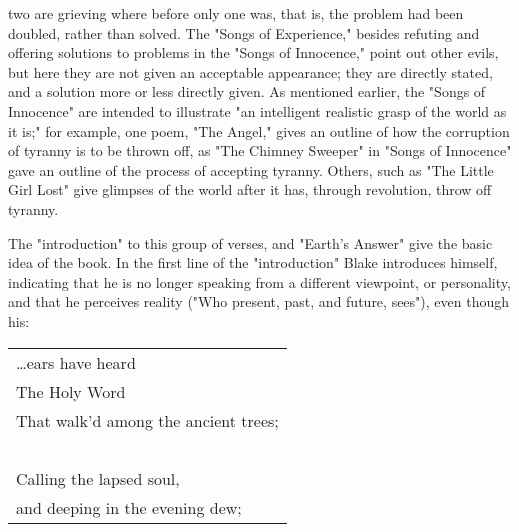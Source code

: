 two are grieving where before only one was, that is, the problem had been doubled, rather than solved. The "Songs of Experience,"
besides refuting and offering solutions to problems in the "Songs of Innocence," point out other evils, but here they are not given an 
acceptable appearance; they are directly stated, and a solution more or less directly given. As mentioned earlier, the "Songs of Innocence" are
intended to illustrate "an intelligent realistic grasp of the world as it is;" for example, one poem, "The Angel," gives an
outline of how the corruption of tyranny is to be thrown off, as "The Chimney Sweeper" in "Songs of Innocence" gave an outline of the
process of accepting tyranny. Others, such as "The Little Girl Lost" give glimpses of the world after it has, through revolution, throw off tyranny.\par
\vspace*{0.5\baselineskip}
The "introduction" to this group of verses, and "Earth's Answer" give the basic idea of the book. In the first line of the "introduction" Blake 
introduces himself, indicating that he is no longer speaking from a different viewpoint, or personality, and that he perceives reality
("Who present, past, and future, sees"), even though his:\par
\begin{center}
	\begin{tabular}{l}
		\dots ears have heard                \\
		The Holy Word                        \\
		That walk'd among the ancient trees; \\
		~                                    \\
		Calling the lapsed soul,             \\
		and deeping in the evening dew;
	\end{tabular}
\end{center}

